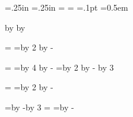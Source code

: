 


\newdimen\totalwidth \newdimen\totalheight
\newdimen\hmargin    \newdimen\vmargin
\newdimen\secskip    \newdimen\lskip
\newdimen\barwidth   \newdimen\barheight
\newdimen\intersecwidth

\totalwidth=11.7in  %
\totalheight=8.27in %
\hmargin=.25in      %
\vmargin=.25in      %
\secskip=1pc        %
\lskip=2pt          %
\ifx\pdfoutput\undefined\else   %
  \pdfpagewidth=\totalwidth     %
  \pdfpageheight=\totalheight   %
\fi
\barwidth=.1pt       %
\barheight=2pt       %
\intersecwidth=0.5em %

\newdimen\fullhsize     %
\newdimen\itmwid        %
\newdimen\dfnwid        %
\newdimen\temp          %

\hoffset=-1in \advance \hoffset by \hmargin
\voffset=-1in \advance \voffset by \vmargin

\fullhsize=\totalwidth
\temp=\hmargin \multiply \temp by 2 \advance \fullhsize by -\temp

\hsize=\fullhsize
\temp=\hmargin \multiply \temp by 4 \advance \hsize by -\temp
\temp=\barwidth \multiply \temp by 2 \advance \hsize by -\temp
\divide \hsize by 3

\vsize=\totalheight
\temp=\vmargin \multiply \temp by 2 \advance \vsize by -\temp

\temp=\hsize \advance \temp by -\intersecwidth \divide \temp by 3
\itmwid=\temp
\dfnwid=\hsize \advance \dfnwid by -\itmwid

